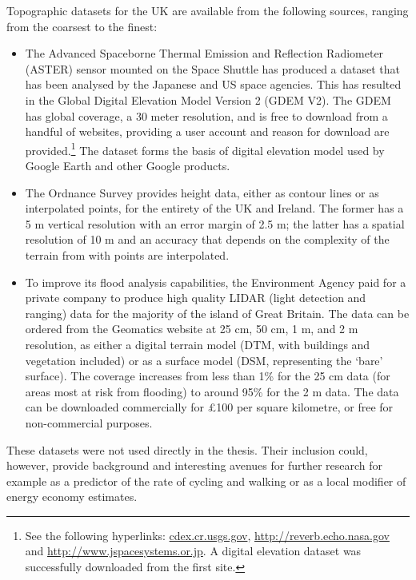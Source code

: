 \documentclass[a4paper, 11pt, twoside]{Thesis}
\begin{document}
Topographic datasets for the UK are available from the following sources,
ranging from the coarsest to the finest:
\begin{itemize}
\item The Advanced Spaceborne Thermal Emission and Reflection Radiometer
(ASTER) sensor mounted on the Space Shuttle has produced a dataset that has been
analysed by the Japanese and US space agencies. This has resulted in the Global
Digital Elevation Model Version 2 (GDEM V2). The GDEM has global coverage, a 30
meter resolution, and is free to download from a handful of 
websites, providing a user account and reason for download are
provided.\footnote{See the
following hyperlinks: \href{http://gdex.cr.usgs.gov/gdex/}{cdex.cr.usgs.gov},
\href{http://reverb.echo.nasa.gov/reverb/}{http://reverb.echo.nasa.gov} and
\href{http://www.jspacesystems.or.jp/ersdac/GDEM/E/index.html}
{http://www.jspacesystems.or.jp}. A digital elevation dataset was successfully
downloaded from the first site.} The dataset forms the basis of digital
elevation model used by Google Earth and other Google products.
\item The Ordnance Survey provides height data, either as contour lines or as
interpolated points, for the entirety of the UK and Ireland. The former has a 5
m vertical resolution with an error margin of 2.5 m; the latter has a spatial
resolution of 10 m and an accuracy that depends on the complexity of the
terrain from with points are interpolated.
 \item To improve its flood analysis capabilities, the Environment Agency paid
for a private company to produce high quality LIDAR (light detection and
ranging) data for the majority of the island of Great Britain. The data can be
ordered from the Geomatics website at 25 cm, 50 cm, 1 m, and 2 m resolution, as
either a digital terrain model (DTM, with buildings and vegetation included) or
as a surface model (DSM, representing the `bare' surface). The coverage
increases from less than 1\% for the 25 cm data (for areas most at risk from
flooding) to around 95\% for the 2 m data. The data can be downloaded
commercially for \pounds100 per square kilometre, or free for non-commercial purposes.
\end{itemize}
These datasets were not used directly in the thesis.
Their inclusion could, however, provide background and interesting avenues
for further research for example as a predictor of
the rate of cycling and walking or as a local modifier of energy economy estimates.
\end{document}
